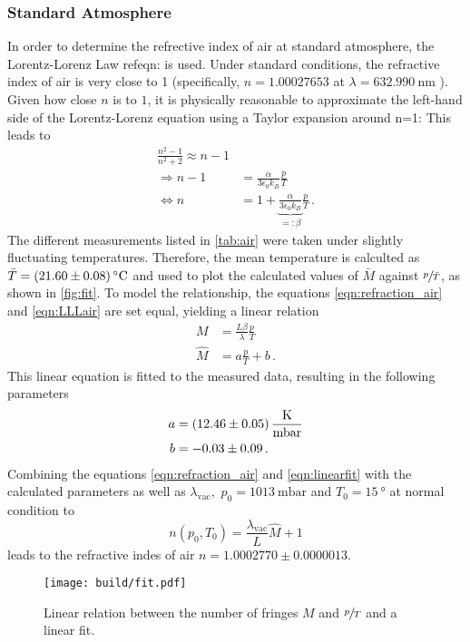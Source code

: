\subsubsection{Standard Atmosphere}
\label{sec:LorentzLorenzLaw}
In order to determine the refrective index of air at standard atmosphere, the Lorentz-Lorenz Law ref{eqn:} is used.
Under standard conditions, the refractive index of air is very close to 1 (specifically, $n=1.00027653$ at $\lambda=\SI{632.990}{\nano\meter}$ \cite{refractiveIndex}). Given how close $n$ is to $1$, it is physically reasonable to approximate the left-hand side of the Lorentz-Lorenz equation using a Taylor expansion around n=1: This leads to 
\begin{align}
    \frac{n^2 -1}{n^2 +2} \approx n-1 \nonumber\\
    \Rightarrow n-1 &= \frac{\alpha}{3 \epsilon _0 k_B} \frac{p}{T} \nonumber\\
    \Leftrightarrow n &= 1  + \underbrace{\frac{\alpha}{3 \epsilon _0 k_B}}_{=:\beta} \frac{p}{T} \label{eqn:LLLair}\,.
\end{align}
The different measurements listed in \autoref{tab:air} were taken under slightly fluctuating temperatures. Therefore, the mean temperature is calculted as $\bar{T}=\SI{21.60\pm0.08}{\celsius}$ and used to plot the calculated values of $\bar{M}$ against $\sfrac{p}{\bar{T}}$, as shown in \autoref{fig:fit}.
To model the relationship, the equations \ref{eqn:refraction_air} and \ref{eqn:LLLair} are set equal, yielding a linear relation
\begin{align}
    M &= \frac{L \beta}{\lambda}\frac{p}{T} \nonumber\\
    \hat{M} &= a \frac{p}{T}+b\,. \label{eqn:linearfit}
\end{align}
This linear equation is fitted to the measured data, resulting in the following parameters
\begin{align*}
    a &= \SI{12.46\pm0.05}{\kelvin\per\milli\bar}\\
    b &= -0.03\pm0.09\,.
\end{align*}
Combining the equations \ref{eqn:refraction_air} and \ref{eqn:linearfit} with the calculated parameters as well as $\lambda_{\text{vac}},\,\,p_0 =\SI{1013}{\milli\bar}$ and $T_0 = \SI{15}{\degree}$ at normal condition to
$$
n(p_0, T_0) = \frac{\lambda_{\text{vac}}}{L} \hat{M} +1$$ 
leads to the refractive indes of air $n = 1.0002770\pm0.0000013$.
\begin{figure}[h]
    \centering
    \texttt{[image: build/fit.pdf]}
    \caption{Linear relation between the number of fringes $M$ and $\sfrac{p}{T}$ and a linear fit.}
    \label{fig:fit}
\end{figure}